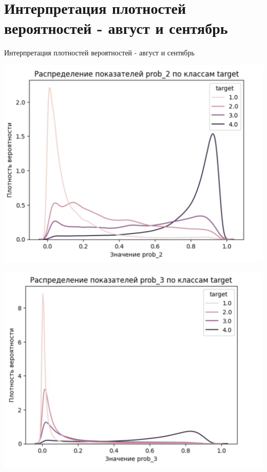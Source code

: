 \documentclass[10pt,pdf,hyperref={unicode}]{beamer}
\begin{document}
\section{Интерпретация плотностей вероятностей - август и сентябрь}
\begin{frame}{Интерпретация плотностей вероятностей - август и сентябрь}
	
	
	\centering
	\begin{minipage}{0.48\textwidth}
		\centering
		\includegraphics[width=\linewidth]{../figures/prob_2_our.png}
	\end{minipage}
	\hfill
	\begin{minipage}{0.48\textwidth}
		\centering
		\includegraphics[width=\linewidth]{../figures/prob_3_our.png}
	\end{minipage}
	
	
	
\end{frame}
\end{document}
